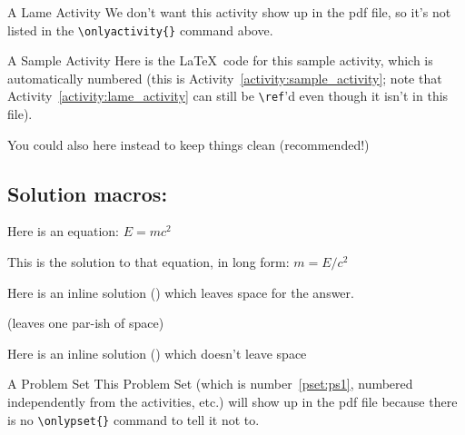 \documentclass[12pt]{article}
\author{} %
\date{} %
\begin{document}
\begin{activity}{A Lame Activity}
	We don't want this activity show up in the pdf file, so it's not listed in the \verb|\onlyactivity{}| command above.
\end{activity}

\begin{activity}{A Sample Activity}
	Here is the \LaTeX\ code for this sample activity, which is automatically numbered (this is Activity~\ref{activity:sample_activity}; note that Activity~\ref{activity:lame_activity} can still be \verb|\ref|'d even though it isn't in this file).
	
	You could also \verb|| here instead to keep things clean (recommended!)
	
	\subsection*{Solution macros:}
		Here is an equation: $E=mc^2$
\begin{solution}
	    This is the solution to that equation, in long form: $m=E/c^2$
\end{solution}

	    Here is an inline solution () which leaves space for the answer.
    
	     (leaves one par-ish of space)
   
	   	Here is an inline solution () which doesn't leave space
\end{activity}

\begin{pset}[ps1]{A Problem Set}
	This Problem Set (which is number~\ref{pset:ps1}, numbered independently from the activities, etc.) will show up in the pdf file because there is no \verb|\onlypset{}| command to tell it not to.
\end{pset}
\end{document}
